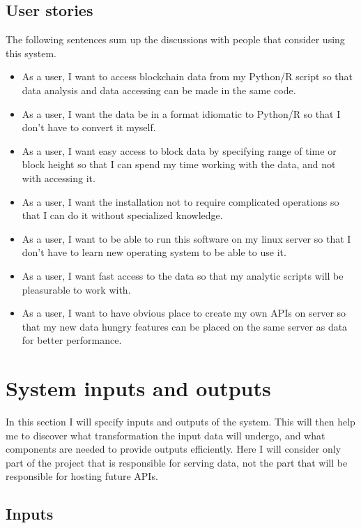 \documentclass[12pt, en, eng, oneside]{mgr}
\begin{document}
\subsection{User stories}

The following sentences sum up the discussions with people that consider using this system.

\begin{itemize}
\item
As a user, I want to access blockchain data from my Python/R script so that data analysis and data accessing can be made in the same code.
\item
As a user, I want the data be in a format idiomatic to Python/R so that I don't have to convert it myself.
\item
As a user, I want easy access to block data by specifying range of time or block height so that I can spend my time working with the data, and not with accessing it.
\item
As a user, I want the installation not to require complicated operations so that I can do it without specialized knowledge.
\item
As a user, I want to be able to run this software on my linux server so that I don't have to learn new operating system to be able to use it.
\item
As a user, I want fast access to the data so that my analytic scripts will be pleasurable to work with.
\item
As a user, I want to have obvious place to create my own APIs on server so that my new data hungry features can be placed on the same server as data for better performance.
\end{itemize}



\section{System inputs and outputs}

In this section I will specify inputs and outputs of the system. This will then help me to discover what transformation the input data will undergo, and what components are needed to provide outputs efficiently. Here I will consider only part of the project that is responsible for serving data, not the part that will be responsible for hosting future APIs.

\subsection{Inputs}
\end{document}
